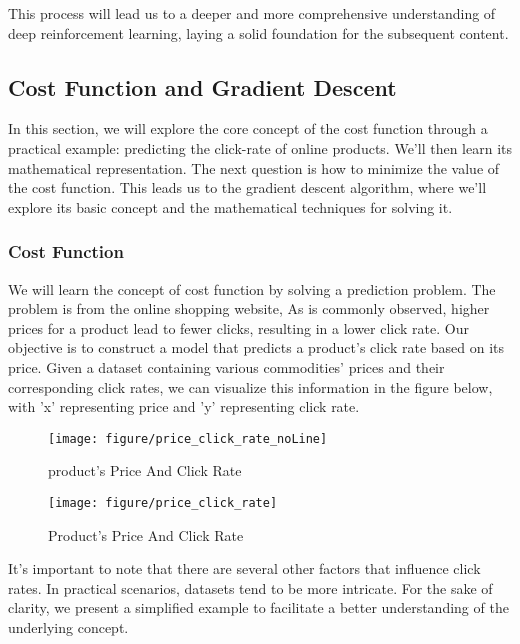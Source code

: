\documentclass{article}
\begin{document}
This process will lead us to a deeper and more comprehensive understanding of deep reinforcement learning, laying a solid foundation for the subsequent content.


    \newpage
	\subsection{Cost Function and Gradient Descent}

    In this section, we will explore the core concept of the cost function through a practical example: predicting the click-rate of online products. We'll then learn its mathematical representation. The next question is how to minimize the value of the cost function. This leads us to the gradient descent algorithm, where we'll explore its basic concept and the mathematical techniques for solving it.


    \newpage
	\subsubsection{Cost Function}
     We will learn the concept of cost function by solving a prediction problem. The problem is from the online shopping website, As is commonly observed, higher prices for a product lead to fewer clicks, resulting in a lower click rate. Our objective is to construct a model that predicts a product's click rate based on its price. Given a dataset containing various commodities' prices and their corresponding click rates, we can visualize this information in the figure below, with 'x' representing price and 'y' representing click rate.


     \begin{figure}[htbp]
        \centering
        \texttt{[image: figure/price\_click\_rate\_noLine]}
        \caption{product's Price And Click Rate}
     \end{figure}

     \begin{figure}[htbp]
        \centering
        \texttt{[image: figure/price\_click\_rate]}
        \caption{Product's Price And Click Rate}
     \end{figure}

     It's important to note that there are several other factors that influence click rates. In practical scenarios, datasets tend to be more intricate. For the sake of clarity, we present a simplified example to facilitate a better understanding of the underlying concept.
\end{document}
